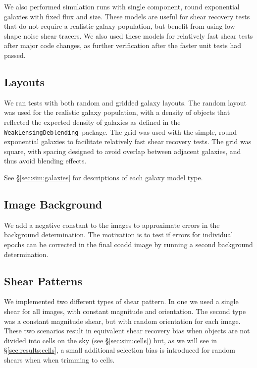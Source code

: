 \documentclass[twocolumn,twocolappendix,astrosym]{openjournal}
\newcommand{\descwl}{\texttt{WeakLensingDeblending}}
\begin{document}
We also performed simulation runs with single component, round exponential
galaxies with fixed flux and size.  These models are useful for shear recovery
tests that do not require a realistic galaxy population, but benefit from using
low shape noise shear tracers.  We also used these models for relatively fast
shear tests after major code changes, as further verification after the faster
unit tests had passed.

\subsection{Layouts} \label{sec:sim:layouts}

We ran tests with both random and gridded galaxy layouts.  The random layout
was used for the realistic galaxy population, with a density of objects that
reflected the expected density of galaxies as defined in the \descwl\ package.
The grid was used with the simple, round exponential galaxies to facilitate
relatively fast shear recovery tests.  The grid was square, with spacing
designed to avoid overlap between adjacent galaxies, and thus avoid blending
effects.

See \S \ref{sec:sim:galaxies} for descriptions of each galaxy model type.

\subsection{Image Background} \label{sec:sim:bgerr}

We add a negative constant to the images to approximate errors in the
background determination.  The motivation is to test if errors for individual
epochs can be corrected in the final coadd image by running a second background
determination.

\subsection{Shear Patterns} \label{sec:sim:shears}

We implemented two different types of shear pattern.  In one we used a single
shear for all images, with constant magnitude and orientation.  The second type
was a constant magnitude shear, but with random orientation for each image.
These two scenarios result in equivalent shear recovery bias when objects are
not divided into cells on the sky (see \S \ref{sec:sim:cells}) but, as we will
see in \S \ref{sec:results:cells}, a small additional selection bias is
introduced for random shears when when trimming to cells.
\end{document}
